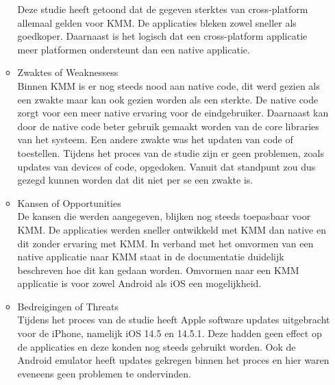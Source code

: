 \begin{itemize}
\begin{itemize}
        Deze studie heeft getoond dat de gegeven sterktes van cross-platform allemaal gelden voor KMM. De applicaties bleken zowel sneller als goedkoper. Daarnaast is het logisch dat een cross-platform applicatie meer platformen ondersteunt dan een native applicatie.
        \\
        \item Zwaktes of Weaknessess\\
        Binnen KMM is er nog steeds nood aan native code, dit werd gezien als een zwakte maar kan ook gezien worden als een sterkte. De native code zorgt voor een meer native ervaring voor de eindgebruiker. Daarnaast kan door de native code beter gebruik gemaakt worden van de core libraries van het systeem. Een andere zwakte was het updaten van code of toestellen. Tijdens het proces van de studie zijn er geen problemen, zoals updates van devices of code, opgedoken. Vanuit dat standpunt zou dus gezegd kunnen worden dat dit niet per se een zwakte is.
        \\
        \item Kansen of Opportunities\\
        De kansen die werden aangegeven, blijken nog steeds toepasbaar voor KMM. De applicaties werden sneller ontwikkeld met KMM dan native en dit zonder ervaring met KMM. In verband met het omvormen van een native applicatie naar KMM staat in de documentatie duidelijk beschreven hoe dit kan gedaan worden. Omvormen naar een KMM applicatie is voor zowel Android als iOS een mogelijkheid.
        \\
        \item Bedreigingen of Threats\\
        Tijdens het proces van de studie heeft Apple software updates uitgebracht voor de iPhone, namelijk iOS 14.5 en 14.5.1. Deze hadden geen effect op de applicaties en deze konden nog steeds gebruikt worden. Ook de Android emulator heeft updates gekregen binnen het proces en hier waren eveneens geen problemen te ondervinden.
    \end{itemize}
\end{itemize}

